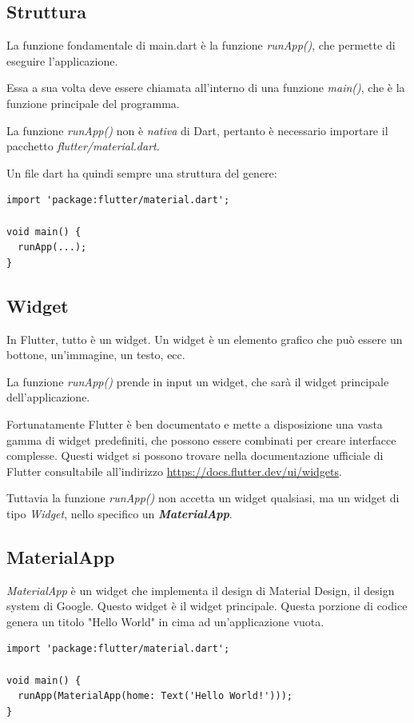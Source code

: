 \documentclass[12pt]{article}
\begin{document}
\subsection{Struttura}
La funzione fondamentale di main.dart è la funzione
\textit{runApp()}, che permette di eseguire l'applicazione.

Essa a sua volta deve essere chiamata all'interno di una funzione
\textit{main()}, che è la funzione principale del programma.

La funzione \textit{runApp()} non è \textit{nativa} di Dart,
pertanto è necessario importare il pacchetto \textit{flutter/material.dart}.

Un file dart ha quindi sempre una struttura del genere:
\begin{verbatim}
import 'package:flutter/material.dart';

void main() {
  runApp(...);
}
\end{verbatim}

\subsection{Widget}
In Flutter, tutto è un widget. Un widget è un elemento grafico
che può essere un bottone, un'immagine, un testo, ecc.

La funzione \textit{runApp()} prende in input un widget, che sarà
il widget principale dell'applicazione.

Fortunatamente Flutter è ben documentato e mette a disposizione
una vasta gamma di widget predefiniti, che possono essere combinati
per creare interfacce complesse. Questi widget si possono
trovare nella documentazione ufficiale di Flutter consultabile
all'indirizzo \url{https://docs.flutter.dev/ui/widgets}.

Tuttavia la funzione \textit{runApp()} non accetta un widget qualsiasi,
ma un widget di tipo \textit{Widget}, nello specifico un \textit{\textbf{MaterialApp}}.

\subsection{MaterialApp}
\textit{MaterialApp} è un widget che implementa il design di Material Design,
il design system di Google. Questo widget è il widget principale. Questa porzione di codice genera un titolo "Hello World" in cima ad un'applicazione vuota.
\begin{verbatim}
import 'package:flutter/material.dart';

void main() {
  runApp(MaterialApp(home: Text('Hello World!')));
}
\end{verbatim}
\end{document}
